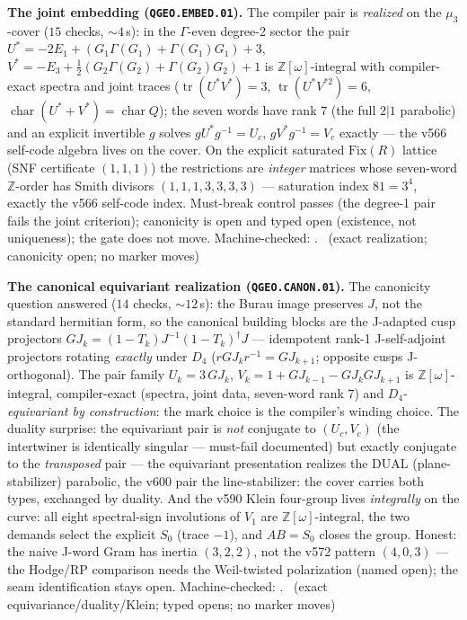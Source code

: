 \documentclass[11pt,a4paper]{article}
\theoremstyle{definition}
\begin{document}
\par\smallskip\noindent\textbf{The joint embedding
(\texttt{QGEO.EMBED.01}).}
The compiler pair is \emph{realized} on the $\mu_3$-cover ($15$
checks, ${\sim}4$\,s): in the $\Gamma$-even degree-2 sector the pair
$U^*=-2E_1+(G_1\Gamma(G_1)+\Gamma(G_1)G_1)+3$,
$V^*=-E_3+\tfrac12(G_2\Gamma(G_2)+\Gamma(G_2)G_2)+1$ is
$\mathbb{Z}[\omega]$-integral with compiler-exact spectra and joint
traces ($\operatorname{tr}(U^*V^*)=3$,
$\operatorname{tr}(U^*V^{*2})=6$,
$\operatorname{char}(U^*{+}V^*)=\operatorname{char}Q$); the seven
words have rank $7$ (the full $2|1$ parabolic) and an explicit
invertible $g$ solves $gU^*g^{-1}=U_c$, $gV^*g^{-1}=V_c$ exactly ---
the v566 self-code algebra lives on the cover.  On the explicit
saturated $\mathrm{Fix}(R)$ lattice (SNF certificate $(1,1,1)$) the
restrictions are \emph{integer} matrices whose seven-word
$\mathbb{Z}$-order has Smith divisors $(1,1,1,3,3,3,3)$ ---
saturation index $81=3^4$, exactly the v566 self-code index.
Must-break control passes (the degree-1 pair fails the joint
criterion); canonicity is open and typed open (existence, not
uniqueness); the gate does not move.
Machine-checked: .
\mE\ (exact realization; canonicity open; no marker moves)
\par\smallskip

\par\smallskip\noindent\textbf{The canonical equivariant realization
(\texttt{QGEO.CANON.01}).}
The canonicity question answered ($14$ checks, ${\sim}12$\,s): the
Burau image preserves $J$, not the standard hermitian form, so the
canonical building blocks are the J-adapted cusp projectors
$GJ_k=(1-T_k)J^{-1}(1-T_k)^\dagger J$ --- idempotent rank-1
J-self-adjoint projectors rotating \emph{exactly} under $D_4$
($rGJ_kr^{-1}=GJ_{k+1}$; opposite cusps J-orthogonal).  The pair
family $U_k=3\,GJ_k$, $V_k=1+GJ_{k-1}-GJ_kGJ_{k+1}$ is
$\mathbb{Z}[\omega]$-integral, compiler-exact (spectra, joint data,
seven-word rank $7$) and $D_4$-\emph{equivariant by construction}:
the mark choice is the compiler's winding choice.  The duality
surprise: the equivariant pair is \emph{not} conjugate to
$(U_c,V_c)$ (the intertwiner is identically singular --- must-fail
documented) but exactly conjugate to the \emph{transposed} pair ---
the equivariant presentation realizes the DUAL (plane-stabilizer)
parabolic, the v600 pair the line-stabilizer: the cover carries both
types, exchanged by duality.  And the v590 Klein four-group lives
\emph{integrally} on the curve: all eight spectral-sign involutions
of $V_1$ are $\mathbb{Z}[\omega]$-integral, the two demands select
the explicit $S_0$ (trace $-1$), and $AB=S_0$ closes the group.
Honest: the naive J-word Gram has inertia $(3,2,2)$, not the v572
pattern $(4,0,3)$ --- the Hodge/RP comparison needs the Weil-twisted
polarization (named open); the seam identification stays open.
Machine-checked: .
\mE\ (exact equivariance/duality/Klein; typed opens; no marker moves)
\par\smallskip
\end{document}
